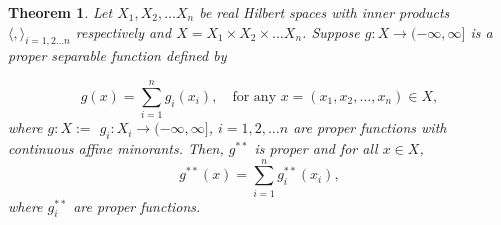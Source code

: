 \documentclass[11pt]{article}
\newtheorem{theorem}{Theorem}
\begin{document}
	
	\begin{theorem}
		Let $X_{1}, X_{2}, \ldots X_{n}$ be real Hilbert spaces with inner products $\langle ,\rangle_{i=1,2\ldots n}$ respectively and $X = X_{1}\times X_{2}\times \ldots X_{n}$.
		Suppose $g:X\to(-\infty,\infty]$ is a proper separable function defined by
		
		\[	g(x) = \sum_{i=1}^{n}g_{i}(x_i), \quad\text{for any }x=(x_1, x_2, \ldots, x_n)\in X,
		\]
		where  $g:X:=$ $g_{i}:X_{i}\to(-\infty, \infty]$, $i=1,2,\ldots n$ are proper functions with continuous affine minorants. Then, $g^{**}$ is proper and for all $x\in X$,
		\[	g^{**}(x) = \sum_{i=1}^{n} g_{i}^{**}(x_i),
		\]
		where $g^{**}_{i}$ are proper functions.
		\end{theorem}
		
		\begin{comment}
		\textbf{Notes:}
		\begin{enumerate}
		\item Proof of separability of $g^{*}$ is adapted from \textcolor{red}{Proposition 13.30} of Bauschke ``Convex analysis and monotone operator theory in Hilbert Spaces.''
		
		\item We allow $\sup = +\infty$ since we are dealing with functions on the extended reals. This also means we do not need to worry about the sets $\{\langle x_i^{*}, x_i\rangle - g_{i}(x_i)\}$ being bounded above, hence additivity of the $\sup$ should always hold.  
		\end{enumerate}
		\end{comment}
	
\end{document}
